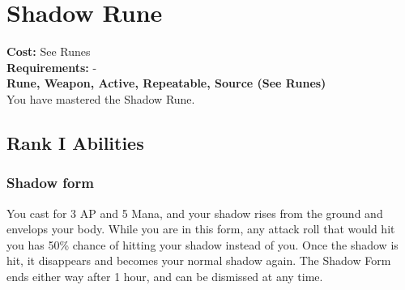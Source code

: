 \section{Shadow Rune}\label{rune:shadow}
\textbf{Cost:} See Runes\\
\textbf{Requirements:} -\\
\textbf{Rune, Weapon, Active, Repeatable, Source (See Runes)}\\
You have mastered the Shadow Rune.

\subsection{Rank I Abilities}

\subsubsection{Shadow form}
You cast for 3 AP and 5 Mana, and your shadow rises from the ground and envelops your body.
While you are in this form, any attack roll that would hit you has 50\% chance of hitting your shadow instead of you.
Once the shadow is hit, it disappears and becomes your normal shadow again.
The Shadow Form ends either way after 1 hour, and can be dismissed at any time.